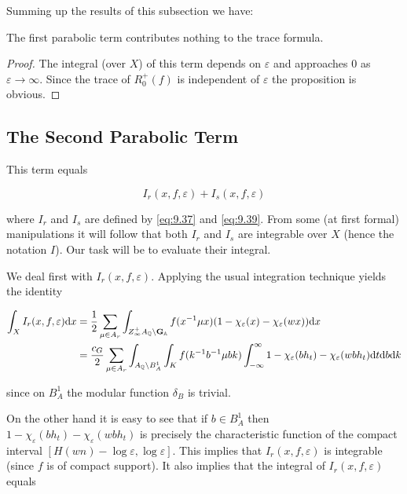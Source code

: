 Summing up the results of this subsection we have:

\begin{proposition}\label{prop:9.16}

The first parabolic term contributes nothing to the trace formula.

\end{proposition}

\begin{proof}

The integral (over $X$) of this term depends on $\varepsilon$ and approaches 0 as $\varepsilon \to \infty$. Since the trace of $R_0^{+}(f)$ is independent of $\varepsilon$ the proposition is obvious.

\end{proof}

\subsection{The Second Parabolic Term}

This term equals

\[
I_r(x, f, \varepsilon) + I_s(x, f, \varepsilon)
\]

where $I_r$ and $I_s$ are defined by \eqref{eq:9.37} and \eqref{eq:9.39}. From some (at first formal) manipulations it will follow that both $I_r$ and $I_s$ are integrable over $X$ (hence the notation $I$). Our task will be to evaluate their integral.

We deal first with $I_r(x, f, \varepsilon)$. Applying the usual integration technique yields the identity

\[
\begin{aligned}
\int_X I_r(x, f, \varepsilon)\mathrm{d} x &= \frac{1}{2}\sum_{\mu \in A_r}\int_{Z_\infty^{+}A_{\mathbb{Q}} \backslash \mathbf{G}_{\mathbb{A}}} f(x^{-1}\mu x)(1 - \chi_\varepsilon(x) - \chi_\varepsilon(wx))\mathrm{d} x\\
&= \frac{c_G}{2}\sum_{\mu \in A_r}\int_{A_{\mathbb{Q}} \backslash B_A^1}\int_K f(k^{-1}b^{-1}\mu bk)\int_{-\infty}^{\infty} 1 - \chi_\varepsilon(bh_t) - \chi_\varepsilon(wbh_t)\mathrm{d} t\mathrm{d} b\mathrm{d} k
\end{aligned}
\]

since on $B_A^1$ the modular function $\delta_B$ is trivial.

On the other hand it is easy to see that if $b \in B_A^1$ then $1 - \chi_\varepsilon(bh_t) - \chi_\varepsilon(wbh_t)$ is precisely the characteristic function of the compact interval $[H(wn) - \log\varepsilon, \log\varepsilon]$. This implies that $I_r(x, f, \varepsilon)$ is integrable (since $f$ is of compact support). It also implies that the integral of $I_r(x, f, \varepsilon)$ equals

